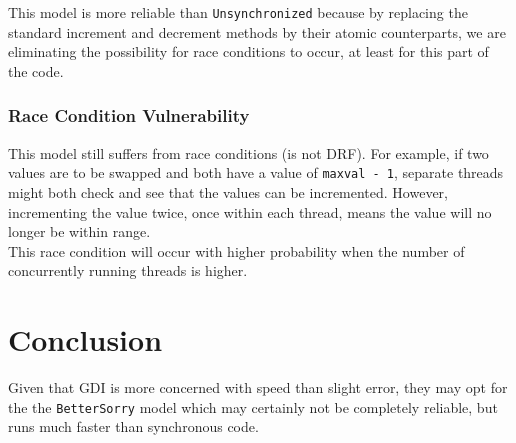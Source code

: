 \documentclass[]{article}
\begin{document}
This model is more reliable than \texttt{Unsynchronized} because by replacing the standard increment and decrement methods by their atomic counterparts, we are eliminating the possibility for race conditions to occur, at least for this part of the code.
\subsubsection{Race Condition Vulnerability}
\label{subsec:drf}
This model still suffers from race conditions (is not DRF). For example, if two values are to be swapped and both have a value of \texttt{maxval - 1}, separate threads might both check and see that the values can be incremented. However, incrementing the value twice, once within each thread, means the value will no longer be within range.\\

This race condition will occur with higher probability when the number of concurrently running threads is higher. 

\section{Conclusion}
Given that GDI is more concerned with speed than slight error, they may opt for the the \texttt{BetterSorry} model which may certainly not be completely reliable, but runs much faster than synchronous code.
\end{document}

